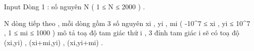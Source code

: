 Input
Dòng 1 : số nguyên N ( 1 ≤ N ≤ 2000 ) .   


   N dòng tiếp theo , mỗi dòng gồm 3 số nguyên xi , yi , mi (  -10^7 ≤ xi , yi ≤ 10^7 , 1 ≤ mi  ≤ 1000 ) mô tả toạ độ tam giác thứ i , 3 đỉnh tam giác i sẽ có toạ độ (xi,yi) , (xi+mi,yi) , (xi,yi+mi) .